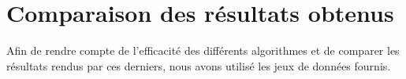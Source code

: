 \section{Comparaison des résultats obtenus}

Afin de rendre compte de l'efficacité des différents algorithmes et de comparer les résultats rendus par ces derniers, nous avons utilisé les jeux de données fournis. 